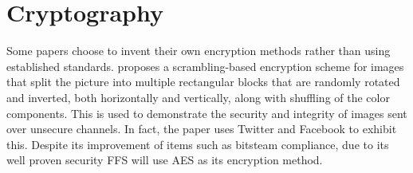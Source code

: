 \section{Cryptography}
Some papers choose to invent their own encryption methods rather than using established standards. \citeauthor{chumanEncryptionThenCompressionSystemsUsing2019} proposes a scrambling-based encryption scheme for images that split the picture into multiple rectangular blocks that are randomly rotated and inverted, both horizontally and vertically, along with shuffling of the color components\cite{chumanEncryptionThenCompressionSystemsUsing2019}. This is used to demonstrate the security and integrity of images sent over unsecure channels. In fact, the paper uses Twitter and Facebook to exhibit this. Despite its improvement of items such as bitsteam compliance, due to its well proven security FFS will use AES as its encryption method. 


